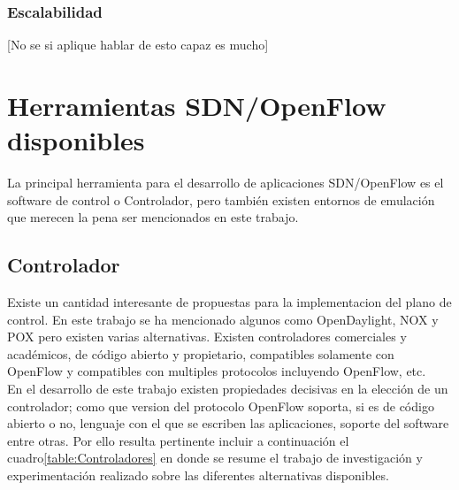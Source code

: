 \subsubsection{Escalabilidad}
[No se si aplique hablar de esto capaz es mucho]

\section{Herramientas SDN/OpenFlow disponibles}

La principal herramienta para el desarrollo de aplicaciones SDN/OpenFlow es el software de control o Controlador, pero también existen entornos de emulación que merecen la pena ser mencionados en este trabajo.

\subsection{Controlador}
Existe un cantidad interesante de propuestas para la implementacion del plano de control. En este trabajo se ha mencionado algunos como OpenDaylight, NOX y POX pero existen varias alternativas. Existen controladores comerciales y académicos, de código abierto y propietario, compatibles solamente con OpenFlow y compatibles con multiples protocolos incluyendo OpenFlow, etc.\\   

En el desarrollo de este trabajo existen propiedades decisivas en la elecci\'on de un controlador; como que version del protocolo OpenFlow soporta, si es de código abierto o no, lenguaje con el que se escriben las aplicaciones, soporte del software entre otras. Por ello resulta pertinente incluir a continuación el cuadro\ref{table:Controladores} en donde se resume el trabajo de investigación y experimentación realizado sobre las diferentes alternativas disponibles. 

